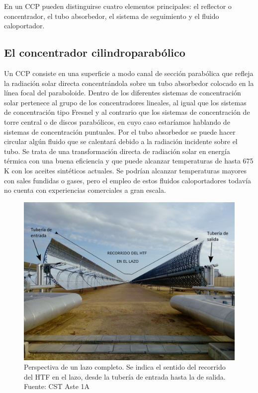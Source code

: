 En un CCP pueden distinguirse cuatro elementos principales: el reflector o concentrador, el tubo absorbedor, el sistema de seguimiento y el fluido caloportador.

\subsection{El concentrador cilindroparabólico}
\label{concentrador}
Un CCP consiste en una superficie a modo canal  de sección parabólica que refleja la radiación solar directa concentrándola sobre un tubo absorbedor colocado en la línea focal del paraboloide. Dentro de los diferentes sistemas de concentración solar pertenece al grupo de los concentradores lineales, al igual que los sistemas de concentración tipo Fresnel y al contrario que los sistemas de concentración de torre central o de discos parabólicos, en cuyo caso estaríamos hablando de sistemas de concentración puntuales. Por el tubo absorbedor se puede hacer circular algún fluido que se calentará debido a la radiación incidente sobre el tubo.  Se trata de una transformación directa de radiación solar en energía térmica con una buena eficiencia y que puede alcanzar temperaturas de hasta 675 K con los aceites sintéticos actuales. Se podrían alcanzar temperaturas mayores con sales fundidas o gases, pero el empleo de estos fluidos caloportadores todavía no cuenta con experiencias comerciales a gran escala.

\begin{figure}[H]
\includegraphics[width=0.9\linewidth]{images/entrada_salida_lazo2_texto.png}
\caption[Lazo de concentradores cilindroparabóicos]{Perspectiva de un lazo completo. Se indica el sentido del recorrido del HTF en el lazo, desde la tubería de entrada hasta la de salida. Fuente: CST Aste 1A} 
\label{fig:entrada_salida_lazo}
\end{figure}


